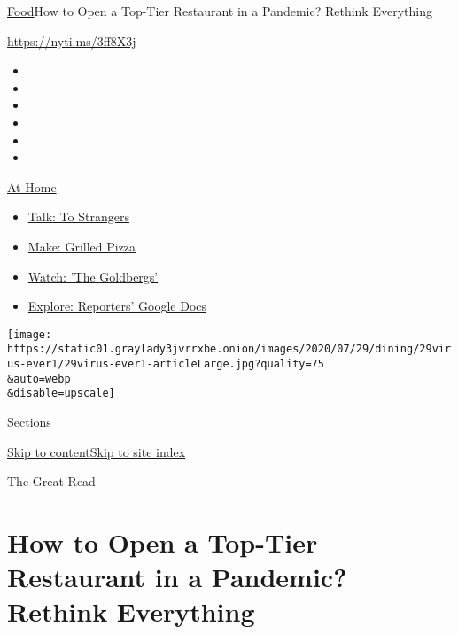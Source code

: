 \href{/section/food}{Food}\textbar{}How to Open a Top-Tier Restaurant in
a Pandemic? Rethink Everything

\href{https://nyti.ms/3ff8X3j}{https://nyti.ms/3ff8X3j}

\begin{itemize}
\item
\item
\item
\item
\item
\item
\end{itemize}

\href{https://www.nytimes3xbfgragh.onion/spotlight/at-home?action=click\&pgtype=Article\&state=default\&region=TOP_BANNER\&context=at_home_menu}{At
Home}

\begin{itemize}
\tightlist
\item
  \href{https://www.nytimes3xbfgragh.onion/2020/08/03/well/family/the-benefits-of-talking-to-strangers.html?action=click\&pgtype=Article\&state=default\&region=TOP_BANNER\&context=at_home_menu}{Talk:
  To Strangers}
\item
  \href{https://www.nytimes3xbfgragh.onion/2020/08/01/at-home/coronavirus-make-pizza-on-a-grill.html?action=click\&pgtype=Article\&state=default\&region=TOP_BANNER\&context=at_home_menu}{Make:
  Grilled Pizza}
\item
  \href{https://www.nytimes3xbfgragh.onion/2020/07/31/arts/television/goldbergs-abc-stream.html?action=click\&pgtype=Article\&state=default\&region=TOP_BANNER\&context=at_home_menu}{Watch:
  'The Goldbergs'}
\item
  \href{https://www.nytimes3xbfgragh.onion/interactive/2020/at-home/even-more-reporters-editors-diaries-lists-recommendations.html?action=click\&pgtype=Article\&state=default\&region=TOP_BANNER\&context=at_home_menu}{Explore:
  Reporters' Google Docs}
\end{itemize}

\texttt{[image: https://static01.graylady3jvrrxbe.onion/images/2020/07/29/dining/29virus-ever1/29virus-ever1-articleLarge.jpg?quality=75\\\&auto=webp\\\&disable=upscale]}

Sections

\protect\hyperlink{site-content}{Skip to
content}\protect\hyperlink{site-index}{Skip to site index}

The Great Read

\hypertarget{how-to-open-a-top-tier-restaurant-in-a-pandemic-rethink-everything}{%
\section{How to Open a Top-Tier Restaurant in a Pandemic? Rethink
Everything}\label{how-to-open-a-top-tier-restaurant-in-a-pandemic-rethink-everything}}

